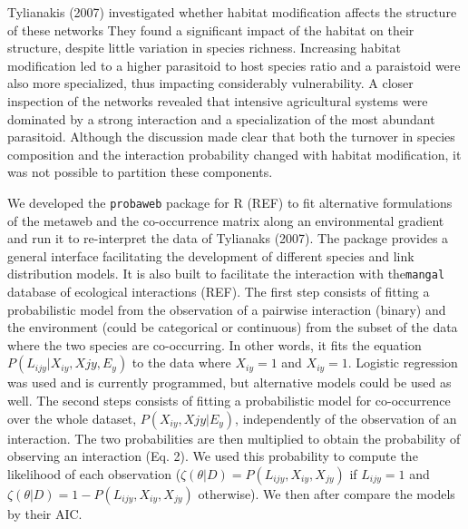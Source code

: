 \documentclass[12pt]{article}
\begin{document}
Tylianakis (2007) investigated whether habitat modification affects
the structure of these networks They found a significant impact of
the habitat on their structure, despite little variation in species
richness. Increasing habitat modification led to a higher parasitoid
to host species ratio and a paraistoid were also more specialized, thus
impacting considerably vulnerability. A closer inspection of the networks
revealed that intensive agricultural systems were dominated by a strong
interaction and a specialization of the most abundant parasitoid. Although
the discussion made clear that both the turnover in species composition and
the interaction probability changed with habitat modification, it was not
possible to partition these components.

We developed the \texttt{probaweb} package for R (REF) to fit
alternative formulations of the metaweb and the co-occurrence matrix
along an environmental gradient and run it to re-interpret the data of
Tylianaks (2007). The package provides a general interface facilitating
the development of different species and link distribution models. It is
also built to facilitate the interaction with the\texttt{mangal} database
of ecological interactions (REF). The first step consists of fitting a
probabilistic model from the observation of a pairwise interaction (binary)
and the environment (could be categorical or continuous) from the subset of
the data where the two species are co-occurring. In other words, it fits
the equation $P(L_{ijy}|X_{iy},X{jy},E_y)$ to the data where $X_{iy} = 1$
and $X_{iy} = 1$. Logistic regression was used and is currently programmed,
but alternative models could be used as well. The second steps consists of
fitting a probabilistic model for co-occurrence over the whole dataset,
$P(X_{iy},X{jy}|E_y)$, independently of the observation of an interaction. The
two probabilities are then multiplied to obtain the probability of observing
an interaction (Eq. 2). We used this probability to compute the likelihood of
each observation ($\zeta(\theta|D) = P(L_{ijy},X_{iy},X_{jy})$ if $L_{ijy}=1$
and $\zeta(\theta|D) = 1 - P(L_{ijy},X_{iy},X_{jy})$ otherwise). We then
after compare the models by their AIC.
\end{document}
